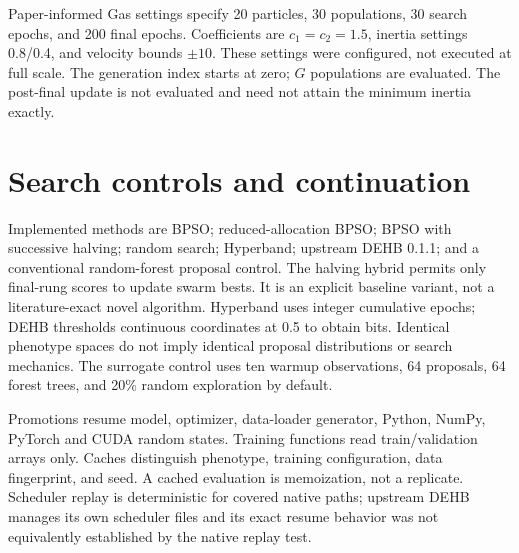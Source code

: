 \documentclass[11pt,a4paper]{report}
\begin{document}
\noindent{}

Paper-informed Gas settings specify 20 particles, 30 populations, 30 search epochs, and 200 final epochs. Coefficients are $c_1=c_2=1.5$, inertia settings 0.8/0.4, and velocity bounds $\pm10$. These settings were configured, not executed at full scale. The generation index starts at zero; $G$ populations are evaluated. The post-final update is not evaluated and need not attain the minimum inertia exactly.

\section{Search controls and continuation}
Implemented methods are BPSO; reduced-allocation BPSO; BPSO with successive halving; random search; Hyperband; upstream DEHB 0.1.1; and a conventional random-forest proposal control. The halving hybrid permits only final-rung scores to update swarm bests. It is an explicit baseline variant, not a literature-exact novel algorithm. Hyperband uses integer cumulative epochs; DEHB thresholds continuous coordinates at 0.5 to obtain bits. Identical phenotype spaces do not imply identical proposal distributions or search mechanics. The surrogate control uses ten warmup observations, 64 proposals, 64 forest trees, and 20\% random exploration by default.

Promotions resume model, optimizer, data-loader generator, Python, NumPy, PyTorch and CUDA random states. Training functions read train/validation arrays only. Caches distinguish phenotype, training configuration, data fingerprint, and seed. A cached evaluation is memoization, not a replicate. Scheduler replay is deterministic for covered native paths; upstream DEHB manages its own scheduler files and its exact resume behavior was not equivalently established by the native replay test.
\end{document}
